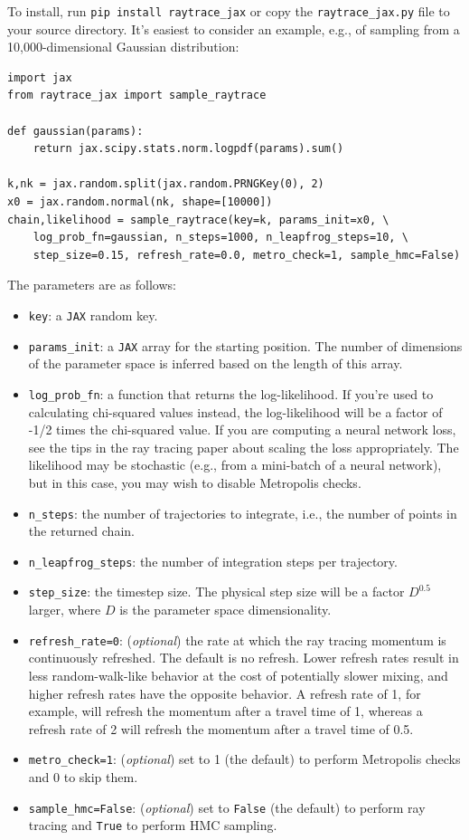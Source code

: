 \documentclass[12pt]{article}
\begin{document}
To install, run \texttt{pip install raytrace\_jax} or copy the \texttt{raytrace\_jax.py} file to your source directory.  It's easiest to consider an example, e.g., of sampling from a 10,000-dimensional Gaussian distribution:
\begin{lstlisting}
import jax
from raytrace_jax import sample_raytrace

def gaussian(params):
    return jax.scipy.stats.norm.logpdf(params).sum()

k,nk = jax.random.split(jax.random.PRNGKey(0), 2)
x0 = jax.random.normal(nk, shape=[10000])
chain,likelihood = sample_raytrace(key=k, params_init=x0, \
    log_prob_fn=gaussian, n_steps=1000, n_leapfrog_steps=10, \
    step_size=0.15, refresh_rate=0.0, metro_check=1, sample_hmc=False)
\end{lstlisting}
The parameters are as follows:
\begin{itemize}
\item \lstinline{key}: a \texttt{JAX} random key.
\item \lstinline{params_init}: a \texttt{JAX} array for the starting position.  The number of dimensions of the parameter space is inferred based on the length of this array.
\item \lstinline{log_prob_fn}: a function that returns the log-likelihood.  If you're used to calculating chi-squared values instead, the log-likelihood will be a factor of -1/2 times the chi-squared value.  If you are computing a neural network loss, see the tips in the ray tracing paper about scaling the loss appropriately.  The likelihood may be stochastic (e.g., from a mini-batch of a neural network), but in this case, you may wish to disable Metropolis checks.
\item \lstinline{n_steps}: the number of trajectories to integrate, i.e., the number of points in the returned chain.
\item \lstinline{n_leapfrog_steps}: the number of integration steps per trajectory.
\item \lstinline{step_size}: the timestep size.  The physical step size will be a factor $D^{0.5}$ larger, where $D$ is the parameter space dimensionality.
\item \lstinline{refresh_rate=0}: (\textit{optional}) the rate at which the ray tracing momentum is continuously refreshed.  The default is no refresh.  Lower refresh rates result in less random-walk-like behavior at the cost of potentially slower mixing, and higher refresh rates have the opposite behavior.  A refresh rate of 1, for example, will refresh the momentum after a travel time of 1, whereas a refresh rate of 2 will refresh the momentum after a travel time of 0.5.
\item \lstinline{metro_check=1}: (\textit{optional}) set to 1 (the default) to perform Metropolis checks and 0 to skip them.  
\item \lstinline{sample_hmc=False}: (\textit{optional}) set to \lstinline{False} (the default) to perform ray tracing and \lstinline{True} to perform HMC sampling.  
\end{itemize}
\end{document}
